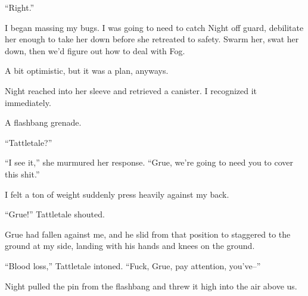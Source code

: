 ``Right.''



I began massing my bugs.  I was going to need to catch Night off guard, debilitate her enough to take her down before she retreated to safety.  Swarm her, swat her down, then we'd figure out how to deal with Fog.



A bit optimistic, but it was a plan, anyways.



Night reached into her sleeve and retrieved a canister.  I recognized it immediately.



A flashbang grenade.



``Tattletale?''



``I see it,'' she murmured her response.  ``Grue, we're going to need you to cover this shit.''



I felt a ton of weight suddenly press heavily against my back.



``Grue!'' Tattletale shouted.



Grue had fallen against me, and he slid from that position to staggered to the ground at my side, landing with his hands and knees on the ground.



``Blood loss,'' Tattletale intoned.  ``Fuck, Grue, pay attention, you've--''



Night pulled the pin from the flashbang and threw it high into the air above us.





